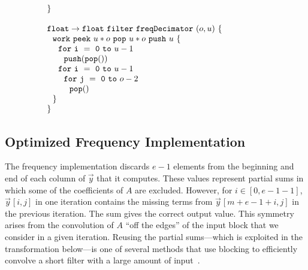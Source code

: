 \begin{transformation}
\begin{equation}
{\begin{array}{ll}
    {\tt \}} \\ ~ \\
    {\tt float \rightarrow float}~{\tt filter~freqDecimator~}(o, u){\tt ~\{} & \hspace{40pt}\\
    ~~{\tt work~}{\tt peek}~u*o~{\tt pop}~u*o~{\tt push}~u~{\tt \{} \\
    ~~~~{\tt for~i~=~0~to~}u-1 \\
    ~~~~~~{\tt push(pop())} \\
    ~~~~{\tt for~i~=~0~to~}u-1 \\
    ~~~~~~{\tt for~j~=~0~to~}o-2 \\
    ~~~~~~~~{\tt pop()} \\
    ~~{\tt \}} \\
    {\tt \}}
  \end{array}}
\end{equation}
\label{trans:freq1}
\end{transformation}

\subsection{Optimized Frequency Implementation}

The {\naive} frequency implementation discards $e-1$ elements from the
beginning and end of each column of ${\vec y}$ that it computes.
These values represent partial sums in which some of the coefficients
of $A$ are excluded. However, for $i \in [0, e-1-1]$, ${\vec
y}\hspace{1pt}[i,j]$ in one iteration contains the missing terms from
${\vec y}\hspace{1pt}[m+e-1+i,j]$ in the previous iteration.  The sum
gives the correct output value.  This symmetry arises from the
convolution of $A$ ``off the edges'' of the input block that we
consider in a given iteration. Reusing the partial sums---which is
exploited in the transformation below---is one of several methods that
use blocking to efficiently convolve a short filter with a large
amount of input~\cite{oppenheim-discrete}.

